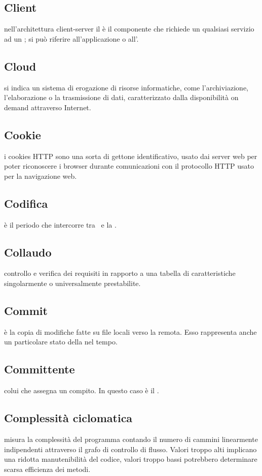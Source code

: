 \documentclass[12pt,a4paper]{article}
\begin{document}
\subsection{Client}
nell'architettura client-server il  è il componente che richiede un qualsiasi servizio ad un ; si può riferire all'applicazione o all'.

\subsection{Cloud}
 si indica un sistema di erogazione di risorse informatiche, come l'archiviazione, l'elaborazione o la trasmissione di dati, caratterizzato dalla disponibilità on demand attraverso Internet.

\subsection{Cookie}
i cookies HTTP sono una sorta di gettone identificativo, usato dai server web per poter riconoscere i browser durante comunicazioni con il protocollo HTTP usato per la navigazione web.

\subsection{Codifica} 
 è il periodo che intercorre tra \RP\ e la \RQ.

\subsection{Collaudo} 
 controllo e verifica dei requisiti in rapporto a una tabella di caratteristiche singolarmente o universalmente prestabilite.

\subsection{Commit} 
 è la copia di modifiche fatte su file locali verso la  remota. Esso rappresenta anche un particolare stato della  nel tempo.

\subsection{Committente} 
 colui che assegna un compito. In questo caso è il \Vardanega{}.
 
 \subsection{Complessità ciclomatica}
 misura la complessità del programma contando il numero di cammini linearmente indipendenti attraverso il grafo di controllo di flusso. Valori troppo alti implicano una ridotta manutenibilità del codice, valori troppo bassi potrebbero determinare scarsa efficienza dei metodi.
\end{document}
